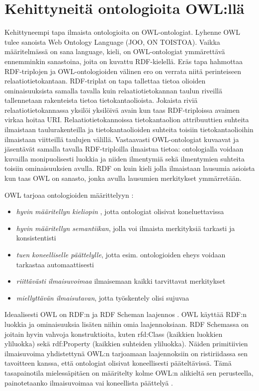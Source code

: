 \documentclass[finnish]{tktltiki2}
\theoremstyle{definition}
\theoremstyle{remark}
\begin{document}
\section{Kehittyneitä ontologioita OWL:llä}
Kehittyneempi tapa ilmaista ontologioita on OWL-ontologiat. Lyhenne OWL tulee 
sanoista Web Ontology Language (JOO, ON TOISTOA). Vaikka määritelmässä on sana language, kieli, on 
OWL-ontologiat ymmärettävä ennemminkin sanastoina, joita on kuvattu RDF-kielellä.
Eräs tapa hahmottaa RDF-triplojen ja OWL-ontologioiden välinen ero on verrata niitä perinteiseen
relaatiotietokantaan. RDF-triplat on tapa tallettaa tietoa olioiden ominaisuuksista samalla tavalla kuin
relaatiotietokannan taulun riveillä tallennetaan rakenteista tietoa tietokantaolioista. Jokaista riviä relaatiotietokannassa
yksilöi yksilöivä avain kun taas RDF-triploissa avaimen virkaa hoitaa URI. Relaatiotietokannoissa tietokantaolion attribuuttien suhteita ilmaistaan taulurakenteilla ja tietokantaolioiden suhteita toisiin tietokantaolioihin ilmaistaan viitteillä taulujen välillä. Vastaavasti OWL-ontologiat kuvaavat ja jäsentävät  samalla tavalla RDF-triploilla ilmaistua tietoa: ontologialla voidaan kuvailla monipuolisesti luokkia ja niiden ilmentymiä sekä ilmentymien suhteita toisiin ominaisuuksien avulla. RDF on kuin kieli jolla ilmaistaan lausumia asioista kun taas OWL on sanasto, jonka avulla lausumien merkitykset ymmärretään. 

OWL tarjoaa ontologioiden määrittelyyn \cite{AH09}: 
\begin{itemize}
\item \textit{hyvin määritellyn kieliopin} , jotta ontologiat olisivat koneluettavissa
\item \textit{hyvin määritellyn semantiikan}, jolla voi ilmaista merkityksiä tarkasti ja konsistentisti
\item \textit{tuen koneelliselle päättelylle}, jotta esim.  ontologioiden eheys voidaan tarkastaa automaattisesti
\item \textit{riittävästi ilmaisuvoimaa} ilmaisemaan kaikki tarvittavat merkitykset
\item \textit{miellyttävän ilmaisutavan}, jotta työskentely olisi sujuvaa
\end{itemize}

Ideaalisesti OWL on RDF:n ja RDF Scheman laajennos \cite{AH09}. OWL käyttää
RDF:n luokkia ja ominaisuuksia lisäten niihin omia laajennoksiaan. RDF Schemassa on joitain 
hyvin vahvoja konstruktioita, kuten rfd:Class
(kaikkien luokkien yliluokka) sekä rdf:Property (kaikkien suhteiden yliluokka).
Näiden primitiivien ilmaisuvoima yhdistettynä OWL:n tarjoamaan laajennoksiin
on ristiriidassa sen tavoitteen kanssa, että ontologiat olisivat koneellisesti
pääteltävissä. Tämä tasapainotila mielessäpitäen on määritelty kolme OWL:n
alikieltä sen perusteella, painotetaanko ilmaisuvoimaa vai koneellista päättelyä
\cite{AH09}.  
\end{document}
